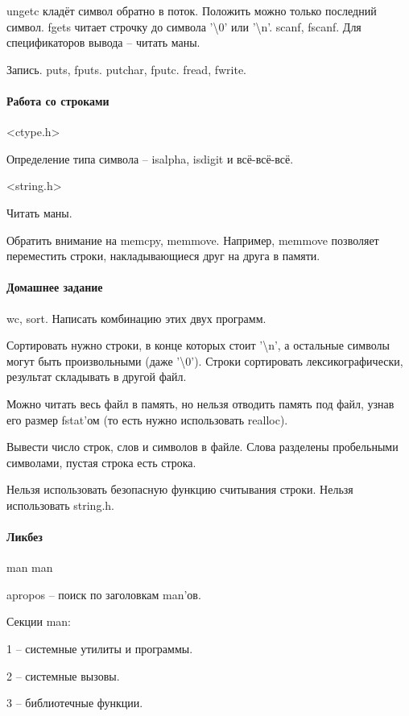 \documentclass[a4paper,10pt]{article}
\begin{document}
ungetc кладёт символ обратно в поток. Положить можно только последний символ.
fgets читает строчку до символа '\textbackslash{}0' или '\textbackslash{}n'. 
scanf, fscanf. Для спецификаторов вывода -- читать маны.

Запись.
puts, fputs.
putchar, fputc.
fread, fwrite.


\paragraph{Работа со строками}

<ctype.h>

Определение типа символа -- isalpha, isdigit и всё-всё-всё.

<string.h>

Читать маны. 

Обратить внимание на memcpy, memmove. Например, memmove позволяет переместить строки, накладывающиеся друг на друга в памяти.


\paragraph{Домашнее задание}

wc, sort. Написать комбинацию этих двух программ.

Сортировать нужно строки, в конце которых стоит '\textbackslash{}n', а остальные символы могут быть произвольными (даже '\textbackslash{}0'). Строки сортировать лексикографически, результат складывать в другой файл.

Можно читать весь файл в память, но нельзя отводить память под файл, узнав его размер fstat'ом (то есть нужно использовать realloc).

Вывести число строк, слов и символов в файле. Слова разделены пробельными символами, пустая строка есть строка.

Нельзя использовать безопасную функцию считывания строки. Нельзя использовать string.h.

\paragraph{Ликбез}

man man

apropos -- поиск по заголовкам man'ов.

Секции man:

1 -- системные утилиты и программы.

2 -- системные вызовы.

3 -- библиотечные функции.
\end{document}
